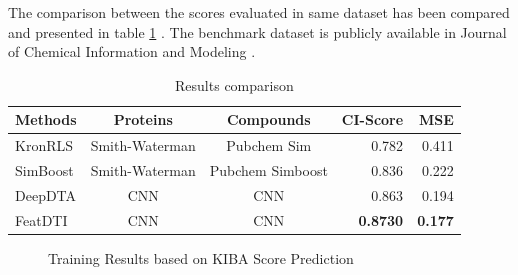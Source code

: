 The comparison between the scores evaluated in same dataset has been compared and presented in table \ref{table:results_comparison} \cite{ozturk2018deepdta}. The benchmark dataset is publicly available in Journal of Chemical Information and Modeling \cite{Tang2013}.

\begin{table} [H]
    \centering
    \caption[]{Results comparison}
    \label{table:results_comparison}
    \begin{tabular}{|l|c|c|r|r|}
        \hline
        
        Methods & Proteins & Compounds & CI-Score & MSE \\ \hline
        KronRLS & Smith-Waterman & Pubchem Sim & 0.782 & 0.411 \\ \hline
        SimBoost & Smith-Waterman & Pubchem Simboost & 0.836 & 0.222 \\ \hline
        DeepDTA & CNN & CNN & 0.863 & 0.194 \\ \hline
        FeatDTI & CNN & CNN & \textbf{0.8730} & \textbf{0.177} \\ \hline
        
        \end{tabular}
\end{table}

\begin{figure}[H]
    \caption{Training Results based on KIBA Score Prediction}
    \label{fig:pred_train}
\end{figure}

